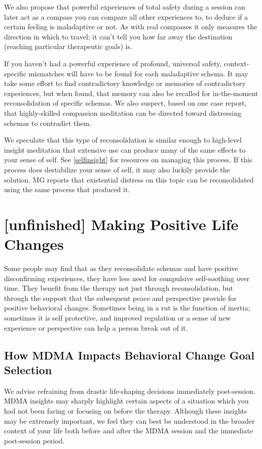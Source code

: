 \documentclass[12pt,letterpaper]{book}
\begin{document}
We also propose that powerful experiences of total safety during a session can later act as a compass you can compare all other experiences to, to deduce if a certain feeling is maladaptive or not. As with real compasses it only measures the direction in which to travel; it can't tell you how far away the destination (reaching particular therapeutic goals) is.

If you haven't had a powerful experience of profound, universal safety, context-specific mismatches will have to be found for each maladaptive schema.  It may take some effort to find contradictory knowledge or memories of contradictory experiences, but when found, that memory can also be recalled for in-the-moment reconsolidation of specific schemas. We also suspect, based on one case report, that highly-skilled compassion meditation can be directed toward distressing schemas to contradict them.

We speculate that this type of reconsolidation is similar enough to high-level insight meditation that extensive use can produce many of the same effects to your sense of self. See \ref{selfinsight} for resources on managing this process. If this process does destabilize your sense of self, it may also luckily provide the solution. MG reports that existential distress on this topic can be reconsolidated using the same process that produced it.
\section{[unfinished] Making Positive Life Changes}
\label{sec:behavioralchange}
Some people may find that as they reconsolidate schemas and have positive disconfirming experiences, they have less need for compulsive self-soothing over time. They benefit from the therapy not just through reconsolidation, but through the support that the subsequent peace and perspective provide for positive behavioral changes. Sometimes being in a rut is the function of inertia; sometimes it is self protective, and improved regulation or a sense of new experience or perspective can help a person break out of it.

\subsection*{How MDMA Impacts Behavioral Change Goal Selection}

We advise refraining from drastic life-shaping decisions immediately post-session. MDMA insights may sharply highlight certain aspects of a situation which you had not been facing or focusing on before the therapy. Although these insights may be extremely important, we feel they can best be understood in the broader context of your life both before and after the MDMA session and the immediate post-session period.
\end{document}
